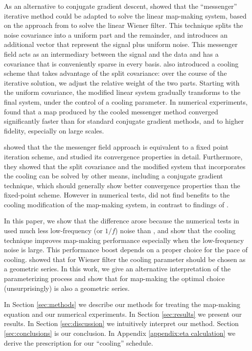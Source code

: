 \documentclass[twocolumn,linenumbers]{aastex631}
\begin{document}
As an alternative to conjugate gradient descent, \citet{Huffenberger_2018} showed that the ``messenger'' iterative method could be adapted to solve the linear map-making system, based on the  approach from \cite{2013A&A...549A.111E} to solve the linear Wiener filter.  This technique splits the noise covariance into a uniform part and the remainder, and introduces an additional vector that represent the signal plus uniform noise.  This messenger field acts as an intermediary between the signal and the data and has a covariance that is conveniently sparse in every basis.  \cite{2013A&A...549A.111E} also introduced a cooling scheme that takes  advantage of the split covariance: over the course of the iterative solution, we adjust the relative weight of the two parts.  Starting with the uniform covariance, the modified linear system gradually transforms to the final system, under the control of a cooling parameter.  In numerical experiments, \citet{Huffenberger_2018} found that a map produced by the cooled messenger method converged significantly faster than for standard conjugate gradient methods, and to higher fidelity, especially on large scales.  

\citet{2018A&A...620A..59P} showed that the the messenger field approach is equivalent to a fixed point iteration scheme, and studied its convergence properties in detail.  Furthermore, they showed that the split covariance and the modified system that incorporates the cooling can be solved by other means, including a conjugate gradient technique, which should generally show better convergence properties than the fixed-point scheme. However in numerical tests, \citet{2018A&A...620A..59P} did not find benefits to the cooling modification of the map-making system, in contrast to findings of \citet{Huffenberger_2018}.

In this paper, we show that the difference arose because the numerical tests in \citet{2018A&A...620A..59P} used much less low-frequency (or $1/f$) noise than \citet{Huffenberger_2018}, and show that the cooling technique improves map-making performance especially when the low-frequency noise is large.  This performance boost depends on a proper choice for the pace of cooling.  \citet{2017MNRAS.468.1782K} showed that for Wiener filter the cooling parameter should be chosen as a geometric series.  In this work, we give an alternative interpretation of the parameterizing process and show that for map-making the optimal choice (unsurprisingly) is also a geometric series.


In Section \ref{sec:methods} we describe our methods for treating the map-making equation and our numerical experiments.
In Section \ref{sec:results} we present our results. 
In Section \ref{sec:discussion} we intuitively interpret our method.
Section \ref{sec:conclusions} is our conclusion.
In Appendix \ref{appendix:eta calculation} we derive the prescription for our ``cooling'' schedule.
\end{document}
